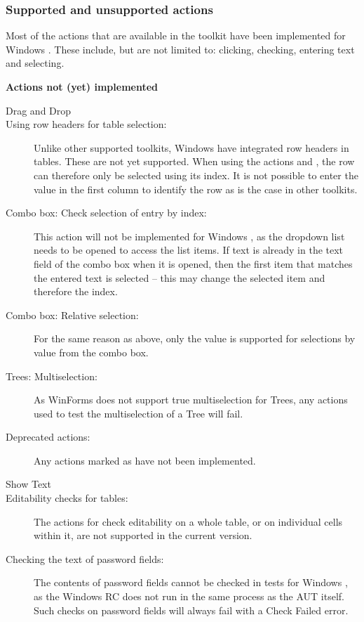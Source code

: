 \subsubsection{Supported and unsupported actions}
Most of the actions that are available in the  toolkit have been implemented for Windows \gdauts{}. These include, but are not limited to: clicking, checking, entering text and selecting.

\textbf{Actions not (yet) implemented}
\begin{description}
\item [Drag and Drop]{}
\item [Using row headers for table selection:]{Unlike other supported toolkits, Windows \gdauts{} have integrated row headers in tables. These are not yet supported. When using the actions  and , the row can therefore only be selected using its index. It is not possible to enter the value in the first column to identify the row as is the case in other toolkits.}
\item[Combo box: Check selection of entry by index:]{This action will not be implemented for Windows \gdauts{}, as the dropdown list needs to be opened to access the list items. If text is already in the text field of the combo box when it is opened, then the first item that matches the entered text is selected -- this may change the selected item and therefore the index.}
\item[Combo box: Relative selection:]{For the same reason as above, only the value  is supported for selections by value from the combo box. }
\item[Trees: Multiselection:]{As WinForms does not support true multiselection for Trees, any actions used to test the multiselection of a Tree will fail.}
\item [Deprecated actions:]{Any actions marked as  have not been implemented.}
\item [Show Text]{}
\item [Editability checks for tables:]{The actions for check editability on a whole table, or on individual cells within it, are not supported in the current version.}
\item [Checking the text of password fields:]{The contents of password fields cannot be checked in tests for Windows \gdauts{}, as the Windows RC does not run in the same process as the AUT itself. Such checks on password fields will always fail with a Check Failed error.}
\end{description}


